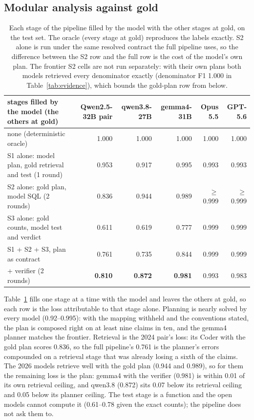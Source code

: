\subsection{Modular analysis against gold}
\label{sec:modular}

\begin{table}[t]
\centering
\small
\setlength{\tabcolsep}{5pt}
\begin{tabular}{lrrrrr}
\toprule
stages filled by the model (the others at gold) & Qwen2.5-32B pair & qwen3.8-27B & gemma4-31B & Opus 5.5 & GPT-5.6 \\
\midrule
none (deterministic oracle) & 1.000 & 1.000 & 1.000 & 1.000 & 1.000 \\
S1 alone: model plan, gold retrieval and test (1 round) & 0.953 & 0.917 & 0.995 & 0.993 & 0.993 \\
S2 alone: gold plan, model SQL (2 rounds) & 0.836 & 0.944 & 0.989 & $\geq$0.999 & $\geq$0.999 \\
S3 alone: gold counts, model test and verdict & 0.611 & 0.619 & 0.777 & 0.999 & 0.999 \\
\midrule
S1 + S2 + S3, plan as contract & 0.761 & 0.735 & 0.844 & 0.999 & 0.999 \\
\quad + verifier (2 rounds) & \textbf{0.810} & \textbf{0.872} & \textbf{0.981} & 0.993 & 0.983 \\
\bottomrule
\end{tabular}
\caption{Each stage of the pipeline filled by the model with the other stages
at gold, on the test set. The oracle (every stage at gold) reproduces the
labels exactly. S2 alone is run under the same resolved contract the full
pipeline uses, so the difference between the S2 row and the full row is the
cost of the model's own plan. The frontier S2 cells are not run separately:
with their own plans both models retrieved every denominator exactly
(denominator F1 1.000 in Table~\ref{tab:evidence}), which bounds the
gold-plan row from below.}
\label{tab:modular}
\end{table}

Table~\ref{tab:modular} fills one stage at a time with the model and leaves
the others at gold, so each row is the loss attributable to that stage
alone. Planning is nearly solved by every model (0.92--0.995): with the
mapping withheld and the conventions stated, the plan is composed right on at
least nine claims in ten, and the gemma4 planner matches the frontier.
Retrieval is the 2024 pair's loss: its Coder with the gold plan scores
0.836, so the full pipeline's 0.761 is the planner's errors compounded on a
retrieval stage that was already losing a sixth of the claims. The 2026
models retrieve well with the gold plan (0.944 and 0.989), so for them the
remaining loss is the plan: gemma4 with the verifier (0.981) is within 0.01 of
its own retrieval ceiling, and qwen3.8 (0.872) sits 0.07 below its retrieval
ceiling and 0.05 below its planner ceiling. The test stage is a function and
the open models cannot compute it (0.61--0.78 given the exact counts); the
pipeline does not ask them to.


